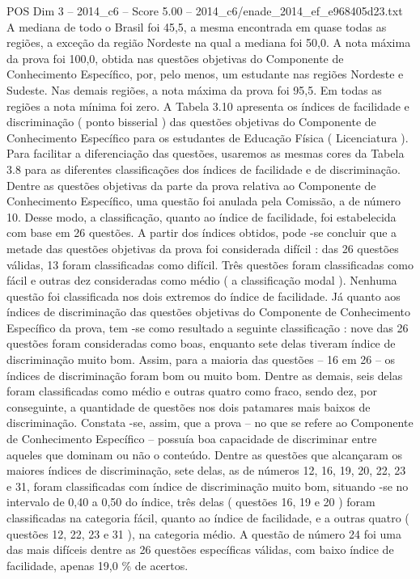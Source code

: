 \begin{textsample}{POS Dim 3 – 2014\_c6 – Score 5.00 – 2014\_c6/enade\_2014\_ef\_e968405d23.txt}
A mediana de todo o Brasil foi 45,5, a mesma encontrada em quase todas as regiões, a exceção da região Nordeste na qual a mediana foi 50,0.
A nota máxima da prova foi 100,0, obtida nas questões objetivas do Componente de Conhecimento Específico, por, pelo menos, um estudante nas regiões Nordeste e Sudeste.
Nas demais regiões, a nota máxima da prova foi 95,5.
Em todas as regiões a nota mínima foi zero.
A Tabela 3.10 apresenta os índices de facilidade e discriminação ( ponto bisserial ) das questões objetivas do Componente de Conhecimento Específico para os estudantes de Educação Física ( Licenciatura ).
Para facilitar a diferenciação das questões, usaremos as mesmas cores da Tabela 3.8 para as diferentes classificações dos índices de facilidade e de discriminação.
Dentre as questões objetivas da parte da prova relativa ao Componente de Conhecimento Específico, uma questão foi anulada pela Comissão, a de número 10.
Desse modo, a classificação, quanto ao índice de facilidade, foi estabelecida com base em 26 questões.
A partir dos índices obtidos, pode -se concluir que a metade das questões objetivas da prova foi considerada difícil : das 26 questões válidas, 13 foram classificadas como difícil.
Três questões foram classificadas como fácil e outras dez consideradas como médio ( a classificação modal ).
Nenhuma questão foi classificada nos dois extremos do índice de facilidade.
Já quanto aos índices de discriminação das questões objetivas do Componente de Conhecimento Específico da prova, tem -se como resultado a seguinte classificação : nove das 26 questões foram consideradas como boas, enquanto sete delas tiveram índice de discriminação muito bom.
Assim, para a maioria das questões – 16 em 26 – os índices de discriminação foram bom ou muito bom.
Dentre as demais, seis delas foram classificadas como médio e outras quatro como fraco, sendo dez, por conseguinte, a quantidade de questões nos dois patamares mais baixos de discriminação.
Constata -se, assim, que a prova – no que se refere ao Componente de Conhecimento Específico – possuía boa capacidade de discriminar entre aqueles que dominam ou não o conteúdo.
Dentre as questões que alcançaram os maiores índices de discriminação, sete delas, as de números 12, 16, 19, 20, 22, 23 e 31, foram classificadas com índice de discriminação muito bom, situando -se no intervalo de 0,40 a 0,50 do índice, três delas ( questões 16, 19 e 20 ) foram classificadas na categoria fácil, quanto ao índice de facilidade, e a outras quatro ( questões 12, 22, 23 e 31 ), na categoria médio.
A questão de número 24 foi uma das mais difíceis dentre as 26 questões específicas válidas, com baixo índice de facilidade, apenas 19,0 \% de acertos.

\end{textsample}
